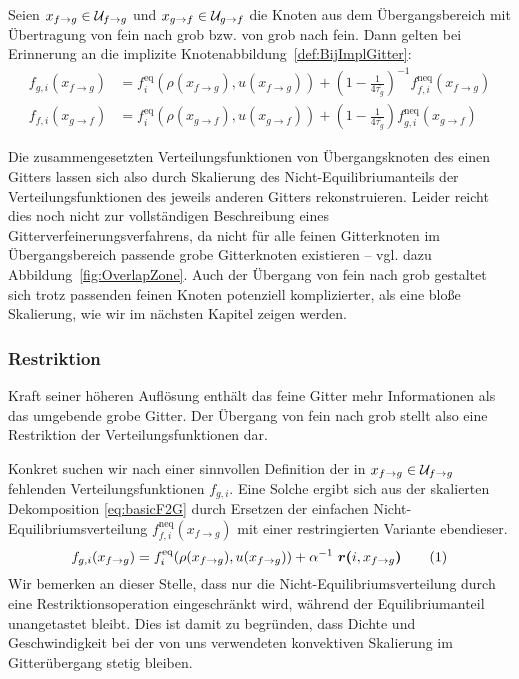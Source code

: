 \bigskip

Seien \(x_{f \to g} \in \mathcal{U}_{f \to g}\) und \(x_{g \to f} \in \mathcal{U}_{g \to f}\) die Knoten aus dem Übergangsbereich mit Übertragung von fein nach grob bzw. von grob nach fein. Dann gelten bei Erinnerung an die implizite Knotenabbildung~\ref{def:BijImplGitter}:
\begin{align}
f_{g,i}(x_{f \to g}) &= f_i^\text{eq}(\rho(x_{f \to g}), u(x_{f \to g})) + \left(1-\frac{1}{4\overline{\tau_g}}\right)^{-1} f_{f,i}^\text{neq}(x_{f \to g}) \label{eq:basicF2G} \\
f_{f,i}(x_{g \to f}) &= f_i^\text{eq}(\rho(x_{g \to f}), u(x_{g \to f})) + \left(1-\frac{1}{4\overline{\tau_g}}\right) f_{g,i}^\text{neq}(x_{g \to f}) \label{eq:basicG2F}
\end{align}

Die zusammengesetzten Verteilungsfunktionen von Übergangsknoten des einen Gitters lassen sich also durch Skalierung des Nicht-Equilibriumanteils der Verteilungsfunktionen des jeweils anderen Gitters rekonstruieren. Leider reicht dies noch nicht zur vollständigen Beschreibung eines Gitterverfeinerungsverfahrens, da nicht für alle feinen Gitterknoten im Übergangsbereich passende grobe Gitterknoten existieren -- vgl. dazu Abbildung~\ref{fig:OverlapZone}. Auch der Übergang von fein nach grob gestaltet sich trotz passenden feinen Knoten potenziell komplizierter, als eine bloße Skalierung, wie wir im nächsten Kapitel zeigen werden.

\newpage
\subsubsection{Restriktion}

Kraft seiner höheren Auflösung enthält das feine Gitter mehr Informationen als das umgebende grobe Gitter. Der Übergang von fein nach grob stellt also eine Restriktion der Verteilungsfunktionen dar.

Konkret suchen wir nach einer sinnvollen Definition der in \(x_{f \to g} \in \mathcal{U}_{f \to g}\) fehlenden Verteilungsfunktionen \(f_{g,i}\). Eine Solche ergibt sich aus der skalierten Dekomposition \ref{eq:basicF2G} durch Ersetzen der einfachen Nicht-Equilibriumsverteilung \(f_{f,i}^\text{neq}(x_{f \to g})\) mit einer restringierten Variante ebendieser.
\[f_{g,i}(x_{f \to g}) = f_i^\text{eq}(\rho(x_{f \to g}), u(x_{f \to g})) + \alpha^{-1} \ \resarg{i}{x_{f \to g}} \numberthis\label{eq:restrictedF2G}\]
Wir bemerken an dieser Stelle, dass nur die Nicht-Equilibriumsverteilung durch eine Restriktionsoperation eingeschränkt wird, während der Equilibriumanteil unangetastet bleibt. Dies ist damit zu begründen, dass Dichte und Geschwindigkeit bei der von uns verwendeten konvektiven Skalierung im Gitterübergang stetig bleiben.

